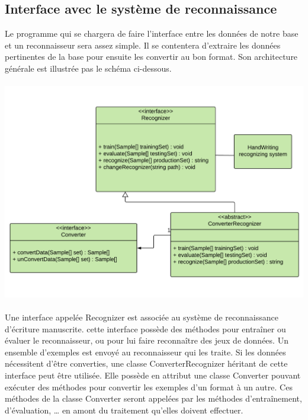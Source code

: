 \subsection{Interface avec le système de reconnaissance}

Le programme qui se chargera de faire l’interface entre les données de notre base et un reconnaisseur sera assez simple. Il se contentera d’extraire les données pertinentes de la base pour ensuite les convertir au bon format. Son architecture générale est illustrée pas le schéma ci-dessous.

\paragraph{}

\begin{mdframed}[frametitle={Figure 9 : Diagramme de classes de l'interface avec le système de reconaissance d'écriture manuscrite}, innerbottommargin=10]
\begin{center}
\includegraphics[width=\linewidth]{interface-reconnaisseur.pdf}
\end{center}
\end{mdframed}

\paragraph{}

Une interface appelée Recognizer est associée au système de reconnaissance d’écriture manuscrite. cette interface possède des méthodes pour entraîner ou  évaluer le reconnaisseur, ou pour lui faire reconnaître des jeux de données. Un ensemble d’exemples est envoyé au reconnaisseur qui les traite.
Si les données nécessitent d’être converties, une classe ConverterRecognizer héritant de cette interface peut être utilisée. Elle possède en attribut une classe Converter pouvant exécuter des méthodes pour convertir les exemples d’un format à un autre. Ces méthodes de la classe Converter seront appelées par les méthodes d’entraînement, d’évaluation, … en amont du traitement qu’elles doivent effectuer.

